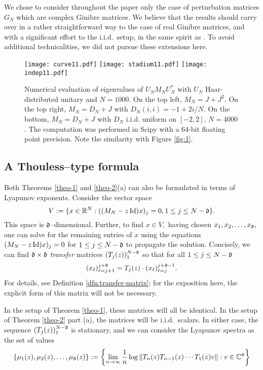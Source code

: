 \documentclass{amsart}
\numberwithin{equation}{section}
\def\corEE{\textcolor{amethyst}}
\def\corEE{}
\def\corABa{}
\def\corOZ{}
\begin{document}
\begin{remark}
We chose to consider  throughout the paper only the case of perturbation
matrices $G_N$ which are complex Ginibre  matrices.
We believe that the results should carry over in a rather
straightforward way
to the case of real Ginibre
matrices, and with a significant effort to the i.i.d.~setup,
\corOZ{in the same spirit as \cite{W}.} To avoid additional
technicalities, we did not pursue these extensions here.
\end{remark}
\begin{figure}[t]
\begin{center}
  \texttt{[image: curve11.pdf]}
  \texttt{[image: stadium11.pdf]}
  \texttt{[image: indep11.pdf]}
\caption{
 Numerical evaluation of eigenvalues of $U_N M_N U_N^*$ with
 $U_N$ Haar-distributed unitary and $N=1000$.
  On the top left,
 $M_N=J+J^2$. On the top right, $M_N=D_N+J$ with $D_N(i,i)=-1+2i/N$. On the
 bottom, $M_N=D_N+J$ with
 $D_N$ i.i.d.  uniform on $[-2,2]$, $N=4000$.
The computation was performed in Scipy with
a 64-bit floating point precision.
Note the similarity with Figure \ref{fig:1}.
}
\label{fig:2}
\end{center}
\end{figure}

\subsection{\corEE{A Thouless--type formula}}

Both Theorems \ref{theo-1} and \corABa{\ref{theo-2}(a)} can also be formulated in terms of Lyapunov exponents.  Consider the vector space
\[
V:= \{ x \in \mathbb{R}^N : ((M_N - z\operatorname{Id})x)_j = 0, 1 \leq j \leq N-\mathfrak{d} \}.
\]
This space is $\mathfrak{d}$--dimensional.  Further, to find $x \in V,$ having chosen $x_1,x_2,\dots, x_{\mathfrak{d}},$ one can solve for the remaining entries of $x$
using the equations $(M_N - z\operatorname{Id})x)_j = 0$ for $1 \leq j \leq N-\mathfrak{d}$ to propagate the solution.  Concisely, we  can find $\mathfrak{d} \times \mathfrak{d}$ \emph{transfer} matrices $(T_j(z))_{1}^{N-\mathfrak{d}}$
so that for all $1 \leq j \leq N-\mathfrak{d}$
\[
(x_\ell)_{\ell = j+1}^{j+\mathfrak{d}} = T_j(z) \cdot (x_\ell)_{\ell = j}^{j+\mathfrak{d}-1}.
\]
For details, see Definition \ref{dfn:transfer-matrix}; for the exposition here, the explicit form of this matrix will not be necessary.

In the setup of Theorem \ref{theo-1}, these matrices will all be identical.  In the setup of Theorem \ref{theo-2} part (a), the matrices will be i.i.d.\ scalars. In either case, the sequence  $(T_j(z))_{1}^{N-\mathfrak{d}}$ is stationary, and we can consider the Lyapunov spectra as the set of values
\[
\{\mu_1(z), \mu_2(z), \ldots , \mu_{\mathfrak{d}}(z)\} := \left\{ \lim_{n \to \infty} \frac{1}{n} \log \| T_n(z) T_{n-1}(z) \cdots T_1(z) v\| : v \in \mathbb{C}^{\mathfrak{d}}\right\}
\]
\end{document}
